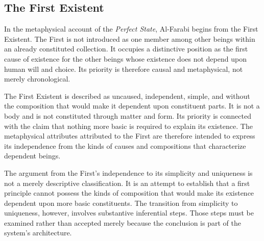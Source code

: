 
\subsection{The First Existent}
\label{subsec:ch08-farabi-first-existent}

\label{para:VS.B01.P01.C08.S12.SS07.P001}

In the metaphysical account of the
\textit{Perfect State}, Al-Farabi
begins from the First Existent.
The First is not introduced as one
member among other beings within
an already constituted collection.
It occupies a distinctive position
as the first cause of existence
for the other beings whose existence
does not depend upon human will
and choice. Its priority is therefore
causal and metaphysical, not merely
chronological.
\citep[pp.~56--89]{AlFarabiVirtuousCity}

\label{para:VS.B01.P01.C08.S12.SS07.P002}

The First Existent is described as
uncaused, independent, simple,
and without the composition that
would make it dependent upon
constituent parts. It is not a body
and is not constituted through
matter and form. Its priority is
connected with the claim that
nothing more basic is required
to explain its existence. The
metaphysical attributes attributed
to the First are therefore intended
to express its independence from
the kinds of causes and compositions
that characterize dependent beings.
\citep[pp.~56--74]{AlFarabiVirtuousCity}

\label{para:VS.B01.P01.C08.S12.SS07.P003}

The argument from the First's
independence to its simplicity
and uniqueness is not a merely
descriptive classification. It is
an attempt to establish that a
first principle cannot possess
the kinds of composition that
would make its existence dependent
upon more basic constituents.
The transition from simplicity
to uniqueness, however, involves
substantive inferential steps.
Those steps must be examined
rather than accepted merely
because the conclusion is part
of the system's architecture.
\citep[sec.~4]{MennAlFarabiMetaphysicsSEP2026}

